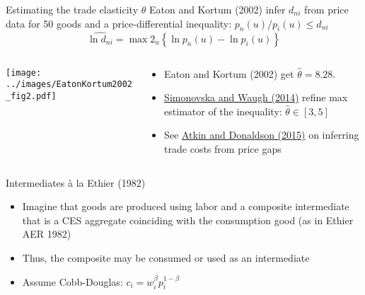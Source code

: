 \documentclass[10pt,notes=hide]{beamer}
\begin{document}
\begin{frame}{Estimating the trade elasticity $\theta$}
Eaton and Kortum (2002) infer $d_{ni}$ from price data for 50 goods and a price-differential inequality:
$%
{p_{n}(u)} / {p_{i}(u)}\leq d_{ni} 
$%
\begin{equation*}
\widehat{\ln d_{ni}}
=
\max2_{u}\left\{ \ln p_{n}(u) -\ln p_{i}(u) \right\}
\end{equation*}
\begin{columns}
\begin{column}{.6\textwidth}
\texttt{[image: ../images/EatonKortum2002\_fig2.pdf]}
\end{column}
\begin{column}{.38\textwidth}
\begin{itemize}
\item Eaton and Kortum (2002) get $\hat{\theta} =8.28$.
\item \href{https://ideas.repec.org/a/eee/inecon/v92y2014i1p34-50.html}{Simonovska and Waugh (2014)} refine max estimator of the inequality: $\hat{\theta} \in \left[3,5
\right]$
\item See \href{https://ideas.repec.org/p/nbr/nberwo/21439.html}{Atkin and Donaldson (2015)} on inferring trade costs from price gaps
\end{itemize}
\end{column}
\end{columns}
\end{frame}
\begin{frame}{Intermediates \`{a} la Ethier (1982)}
\begin{itemize}
	\item Imagine that goods are produced using labor and a composite intermediate that is a CES aggregate coinciding with the consumption good (as in Ethier AER 1982)
	\item Thus, the composite may be consumed or used as an intermediate
	\item Assume Cobb-Douglas: $c_i = w_i^\beta p_i^{1-\beta}$
\end{itemize}
\end{frame}
\end{document}
